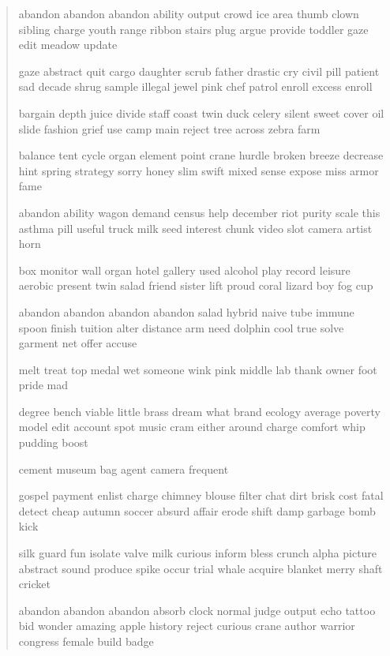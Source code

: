 \documentclass[a5paper, twoside]{book}
\begin{document}
\newpage

\begin{verse}
 abandon abandon abandon ability output crowd ice area thumb clown sibling charge youth range ribbon stairs plug argue provide toddler gaze edit meadow update

 gaze abstract quit cargo daughter scrub father drastic cry civil pill patient sad decade shrug sample illegal jewel pink chef patrol enroll excess enroll

 bargain depth juice divide staff coast twin duck celery silent sweet cover oil slide fashion grief use camp main reject tree across zebra farm

 balance tent cycle organ element point crane hurdle broken breeze decrease hint spring strategy sorry honey slim swift mixed sense expose miss armor fame

 abandon ability wagon demand census help december riot purity scale this asthma pill useful truck milk seed interest chunk video slot camera artist horn

 box monitor wall organ hotel gallery used alcohol play record leisure aerobic present twin salad friend sister lift proud coral lizard boy fog cup

 abandon abandon abandon abandon salad hybrid naive tube immune spoon finish tuition alter distance arm need dolphin cool true solve garment net offer accuse

 melt treat top medal wet someone wink pink middle lab thank owner foot pride mad

 degree bench viable little brass dream what brand ecology average poverty model edit account spot music cram either around charge comfort whip pudding boost

 cement museum bag agent camera frequent

 gospel payment enlist charge chimney blouse filter chat dirt brisk cost fatal detect cheap autumn soccer absurd affair erode shift damp garbage bomb kick

 silk guard fun isolate valve milk curious inform bless crunch alpha picture abstract sound produce spike occur trial whale acquire blanket merry shaft cricket

 abandon abandon abandon absorb clock normal judge output echo tattoo bid wonder amazing apple history reject curious crane author warrior congress female build badge


\end{verse}
\end{document}
